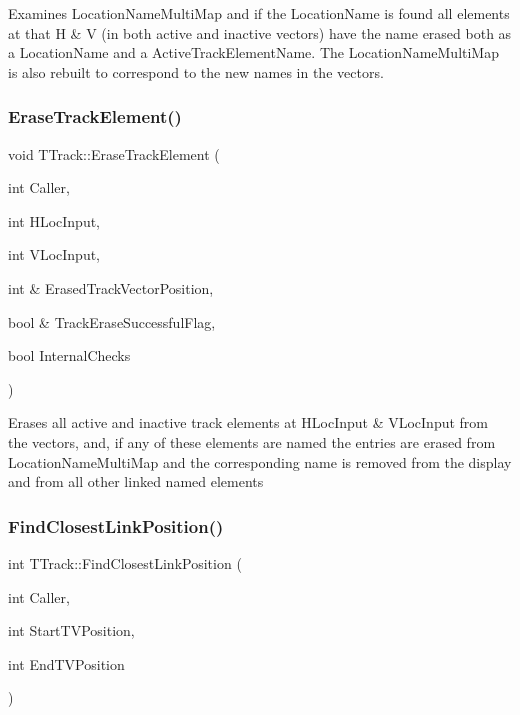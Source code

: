 Examines Location\+Name\+Multi\+Map and if the Location\+Name is found all elements at that H \& V (in both active and inactive vectors) have the name erased both as a Location\+Name and a Active\+Track\+Element\+Name. The Location\+Name\+Multi\+Map is also rebuilt to correspond to the new names in the vectors. \mbox{\label{class_t_track_aa7b58c83ca1743ad3e4607ac0af9c71c}} 
\subsubsection{\texorpdfstring{Erase\+Track\+Element()}{EraseTrackElement()}}
{\footnotesize\ttfamily void T\+Track\+::\+Erase\+Track\+Element (\begin{DoxyParamCaption}\item[{int}]{Caller,  }\item[{int}]{H\+Loc\+Input,  }\item[{int}]{V\+Loc\+Input,  }\item[{int \&}]{Erased\+Track\+Vector\+Position,  }\item[{bool \&}]{Track\+Erase\+Successful\+Flag,  }\item[{bool}]{Internal\+Checks }\end{DoxyParamCaption})}

Erases all active and inactive track elements at H\+Loc\+Input \& V\+Loc\+Input from the vectors, and, if any of these elements are named the entries are erased from Location\+Name\+Multi\+Map and the corresponding name is removed from the display and from all other linked named elements \mbox{\label{class_t_track_a0510eacbf80200ff27d991606acf9924}} 
\subsubsection{\texorpdfstring{Find\+Closest\+Link\+Position()}{FindClosestLinkPosition()}}
{\footnotesize\ttfamily int T\+Track\+::\+Find\+Closest\+Link\+Position (\begin{DoxyParamCaption}\item[{int}]{Caller,  }\item[{int}]{Start\+T\+V\+Position,  }\item[{int}]{End\+T\+V\+Position }\end{DoxyParamCaption})}

